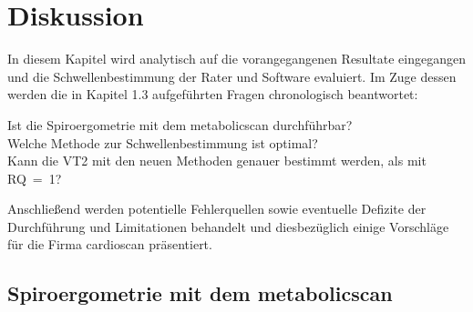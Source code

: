 \chapter{Diskussion}

In diesem Kapitel wird analytisch auf die vorangegangenen Resultate eingegangen und die Schwellenbestimmung der Rater und Software evaluiert. Im Zuge dessen werden die in Kapitel 1.3 aufgeführten Fragen chronologisch beantwortet:
%
\begin{tabbing}
	Ist die Spiroergometrie mit dem metabolicscan durchführbar?\\
	Welche Methode zur Schwellenbestimmung ist optimal?\\
	Kann die VT2 mit den neuen Methoden genauer bestimmt werden, als mit RQ~=~1?
\end{tabbing}
%
Anschließend werden potentielle Fehlerquellen sowie eventuelle Defizite der Durchführung und Limitationen behandelt und diesbezüglich einige Vorschläge für die Firma cardioscan präsentiert.
%

\section{Spiroergometrie mit dem metabolicscan}

